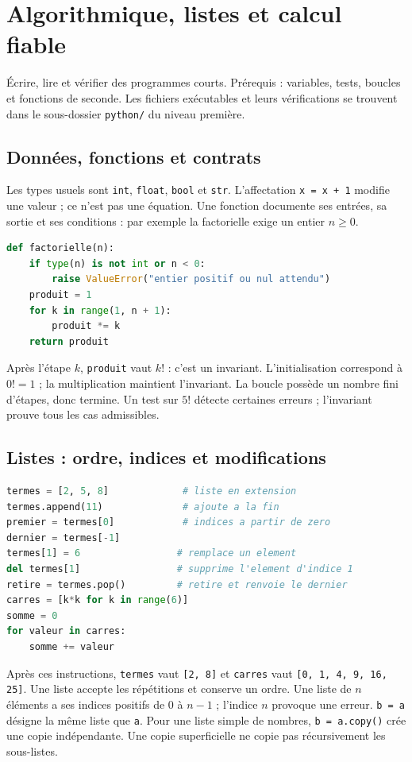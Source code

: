 \documentclass[../cours_1re.tex]{subfiles}
\begin{document}
\setcounter{chapter}{23}
\chapter{Algorithmique, listes et calcul fiable}
\label{ch:24}
\begin{objectif}
Écrire, lire et vérifier des programmes courts. Prérequis : variables, tests, boucles et fonctions de seconde.
Les fichiers exécutables et leurs vérifications se trouvent dans le sous-dossier \texttt{python/} du niveau première.
\end{objectif}
\section{Données, fonctions et contrats}
Les types usuels sont \texttt{int}, \texttt{float}, \texttt{bool} et \texttt{str}.
L'affectation \texttt{x = x + 1} modifie une valeur ; ce n'est pas une équation.
Une fonction documente ses entrées, sa sortie et ses conditions :
par exemple la factorielle exige un entier $n\ge0$.
\begin{lstlisting}[language=Python]
def factorielle(n):
    if type(n) is not int or n < 0:
        raise ValueError("entier positif ou nul attendu")
    produit = 1
    for k in range(1, n + 1):
        produit *= k
    return produit
\end{lstlisting}
Après l'étape $k$, \texttt{produit} vaut $k!$ : c'est un invariant.
L'initialisation correspond à $0!=1$ ; la multiplication maintient l'invariant.
La boucle possède un nombre fini d'étapes, donc termine.
Un test sur $5!$ détecte certaines erreurs ; l'invariant prouve tous les cas admissibles.

\section{Listes : ordre, indices et modifications}
\begin{lstlisting}[language=Python]
termes = [2, 5, 8]             # liste en extension
termes.append(11)              # ajoute a la fin
premier = termes[0]            # indices a partir de zero
dernier = termes[-1]
termes[1] = 6                 # remplace un element
del termes[1]                 # supprime l'element d'indice 1
retire = termes.pop()         # retire et renvoie le dernier
carres = [k*k for k in range(6)]
somme = 0
for valeur in carres:
    somme += valeur
\end{lstlisting}
Après ces instructions, \texttt{termes} vaut \texttt{[2, 8]} et
\texttt{carres} vaut \texttt{[0, 1, 4, 9, 16, 25]}. Une liste accepte
les répétitions et conserve un ordre. Une liste de $n$ éléments a ses indices
positifs de $0$ à $n-1$ ; l'indice $n$ provoque une erreur.
\texttt{b = a} désigne la même liste que \texttt{a}.
Pour une liste simple de nombres, \texttt{b = a.copy()} crée une copie indépendante.
Une copie superficielle ne copie pas récursivement les sous-listes.
\end{document}
